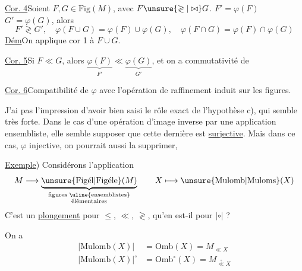 \uline{Cor. 4}\quad Soient $F,G\in\mathrm{Fig}(M)$, avec $F\unsure{\gtrless|\bowtie}G$.   $F'=\varphi(F)$  $G'=\varphi(G)$, alors
\[
F'\gtrless G',\quad\varphi(F\cup G)=\varphi(F)\cup\varphi(G),\quad\varphi(F\cap G)=\varphi(F)\cap\varphi(G)
\]
\uline{Dém}\quad On applique cor 1 à $F\cup G$.

\uline{Cor. 5}\quad Si $F\ll G$, alors $\underbrace{\varphi(F)}_{F'}\ll\underbrace{\varphi(G)}_{G'}$, et on a commutativité de

\uline{Cor. 6}\quad Compatibilité de $\varphi$ avec l'opération de raffinement induit sur les figures.

J'ai pas l'impression d'avoir bien saisi le rôle exact de l'hypothèse c), qui semble très forte. Dans le cas d'une opération d'image inverse par une application ensembliste, elle semble supposer que cette dernière est \uline{surjective}. Mais dans ce cas, $\varphi$   injective, on pourrait aussi la supprimer, 


\uline{Exemple}) Considérons l'application
\[
M\longrightarrow\underbrace{\unsure{\mathrm{Fig\acute{e}l}|\mathrm{Fig\acute{e}le}}(M)}_{\substack{\text{figures \uline{ensemblistes}}\\\text{élémentaires}}}\qquad X\longmapsto\unsure{\mathrm{Mulomb}|\mathrm{Muloms}}(X)
\]
C'est un \uline{plongement} pour $\leq$, $\ll$, $\gtrless$, qu'en est-il pour $\mathrel{|\circ|}$ ?

On a
\[
\begin{aligned}
|\mathrm{Mulomb}(X)|&=\mathrm{Omb}(X)=M_{\ll X}\\
|\mathrm{Mulomb}(X)|^\circ&=\mathrm{Omb}^\circ(X)=M_{\overset{\circ}{\ll}X}
\end{aligned}
\]
